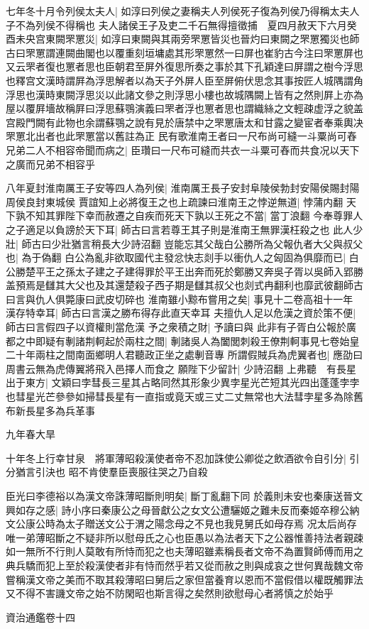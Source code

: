 七年冬十月令列侯太夫人|{
	如淳曰列侯之妻稱夫人列侯死子復為列侯乃得稱太夫人子不為列侯不得稱也}
夫人諸侯王子及吏二千石無得擅徵捕　夏四月赦天下六月癸酉未央宫東闕罘罳災|{
	如淳曰東闕與其兩旁罘罳皆災也晉灼曰東闕之罘罳獨災也師古曰罘罳謂連闕曲閣也以覆重刻垣墉處其形罘罳然一曰屏也崔豹古今注曰罘罳屏也又云罘者復也罳者思也臣朝君至屏外復思所奏之事於其下孔穎達曰屏謂之樹今浮思也釋宫文漢時謂屛為浮思解者以為天子外屏人臣至屏俯伏思念其事按匠人城隅謂角浮思也漢時東闕浮思災以此諸文參之則浮思小樓也故城隅闕上皆有之然則屛上亦為屋以覆屛墻故稱屛曰浮思蘇鶚演義曰罘者浮也罳者思也謂織絲之文輕疎虚浮之貌盖宫殿門闕有此物也余謂蘇鶚之說有見於唐禁中之罘罳唐太和甘露之變宦者奉乘輿决罘罳北出者也此罘罳當以舊註為正}
民有歌淮南王者曰一尺布尚可縫一斗粟尚可舂兄弟二人不相容帝聞而病之|{
	臣瓚曰一尺布可縫而共衣一斗粟可舂而共食况以天下之廣而兄弟不相容乎}


八年夏封淮南厲王子安等四人為列侯|{
	淮南厲王長子安封阜陵侯勃封安陽侯賜封陽周侯良封東城侯}
賈誼知上必將復王之也上疏諫曰淮南王之悖逆無道|{
	悖蒲内翻}
天下孰不知其罪陛下幸而赦遷之自疾而死天下孰以王死之不當|{
	當丁浪翻}
今奉尊罪人之子適足以負謗於天下耳|{
	師古曰言若尊王其子則是淮南王無罪漢枉殺之也}
此人少壯|{
	師古曰少壯猶言稍長大少詩沼翻}
豈能忘其父哉白公勝所為父報仇者大父與叔父也|{
	為于偽翻}
白公為亂非欲取國代主發忿快志剡手以衝仇人之匈固為俱靡而已|{
	白公勝楚平王之孫太子建之子建得罪於平王出奔而死於鄭勝又奔吳子胥以吳師入郢勝盖預焉是讎其大父也及其還楚殺子西子期是讎其叔父也剡式冉翻利也靡武彼翻師古曰言與仇人俱斃康曰武皮切碎也}
淮南雖小黥布嘗用之矣|{
	事見十二卷高祖十一年}
漢存特幸耳|{
	師古曰言漢之勝布得存此直天幸耳}
夫擅仇人足以危漢之資於策不便|{
	師古曰言假四子以資權則當危漢}
予之衆積之財|{
	予讀曰與}
此非有子胥白公報於廣都之中即疑有剸諸荆軻起於兩柱之間|{
	剸諸吳人為闔閭刺殺王僚荆軻事見七卷始皇二十年兩柱之間南面鄉明人君聽政正坐之處剸音專}
所謂假賊兵為虎翼者也|{
	應劭曰周書云無為虎傳翼將飛入邑擇人而食之}
願陛下少留計|{
	少詩沼翻}
上弗聽　有長星出于東方|{
	文穎曰孛彗長三星其占略同然其形象少異孛星光芒短其光四出蓬蓬孛孛也彗星光芒參參如掃彗長星有一直指或竟天或三丈二丈無常也大法彗孛星多為除舊布新長星多為兵革事}


九年春大旱

十年冬上行幸甘泉　將軍薄昭殺漢使者帝不忍加誅使公卿從之飲酒欲令自引分|{
	引分猶言引決也}
昭不肯使羣臣喪服往哭之乃自殺

臣光曰李德裕以為漢文帝誅薄昭斷則明矣|{
	斷丁亂翻下同}
於義則未安也秦康送晉文興如存之感|{
	詩小序曰秦康公之母晉獻公之女文公遭驪姬之難未反而秦姬卒穆公納文公康公時為太子贈送文公于渭之陽念母之不見也我見舅氏如母存焉}
况太后尚存唯一弟薄昭斷之不疑非所以慰母氏之心也臣愚以為法者天下之公器惟善持法者親疎如一無所不行則人莫敢有所恃而犯之也夫薄昭雖素稱長者文帝不為置賢師傅而用之典兵驕而犯上至於殺漢使者非有恃而然乎若又從而赦之則與成哀之世何異哉魏文帝嘗稱漢文帝之美而不取其殺薄昭曰舅后之家但當養育以恩而不當假借以權既觸罪法又不得不害譏文帝之始不防閑昭也斯言得之矣然則欲慰母心者將慎之於始乎

資治通鑑卷十四
